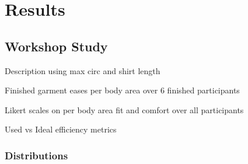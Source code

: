\chapter{Results}

\section{Workshop Study}
Description using max circ and shirt length

Finished garment eases per body area over 6 finished participants

Likert scales on per body area fit and comfort over all participants

Used vs Ideal efficiency metrics

\subsection{Distributions}
